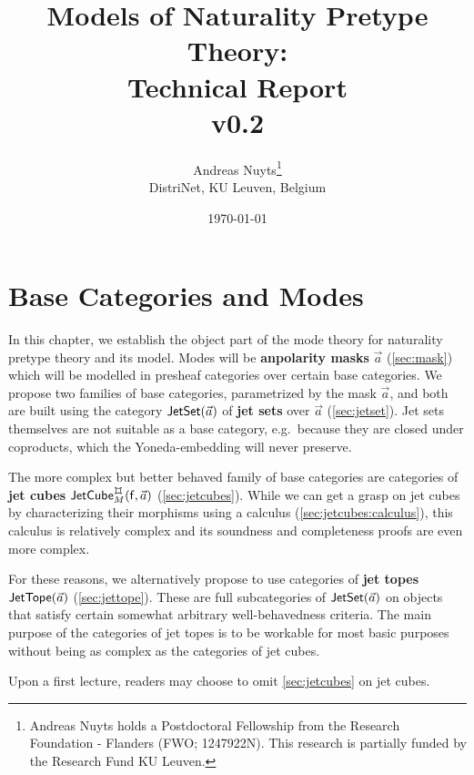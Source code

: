 \documentclass[a4paper]{memoir}
\newcommand{\thetitle}{Models of Naturality Pretype Theory: \\ Technical Report \\ v0.2}
\newcommand{\theauthors}{Andreas Nuyts\thanks{Andreas Nuyts holds a Postdoctoral Fellowship from the Research Foundation - Flanders (FWO; 1247922N). This research is partially funded by the Research Fund KU Leuven.} \\ DistriNet, KU Leuven, Belgium}
\begin{document}
	\addtolength{\voffset}{-.5in}

\title{\thetitle}
\date{\today}
\author{\theauthors{}}
\maketitle

\pagebreak

\tableofcontents


\chapter{Base Categories and Modes} \label{ch:modes}

In this chapter, we establish the object part of the mode theory for naturality pretype theory and its model.
Modes will be \textbf{anpolarity masks} $\vec a$ (\cref{sec:mask}) which will be modelled in presheaf categories over certain base categories.
We propose two families of base categories, parametrized by the mask $\vec a$, and both are built using the category $\mathsf{JetSet}(\vec a)$ of \textbf{jet sets} over $\vec a$ (\cref{sec:jetset}).
Jet sets themselves are not suitable as a base category, e.g.\ because they are closed under coproducts, which the Yoneda-embedding will never preserve.

The more complex but better behaved family of base categories are categories of \textbf{jet cubes} $\jetcubefwd \mycubex M {\vec a}$ (\cref{sec:jetcubes}).
While we can get a grasp on jet cubes by characterizing their morphisms using a calculus (\cref{sec:jetcubes:calculus}), this calculus is relatively complex and its soundness and completeness proofs are even more complex.

For these reasons, we alternatively propose to use categories of \textbf{jet topes} $\mathsf{JetTope}(\vec a)$ (\cref{sec:jettope}). These are full subcategories of $\mathsf{JetSet}(\vec a)$ on objects that satisfy certain somewhat arbitrary well-behavedness criteria.
The main purpose of the categories of jet topes is to be workable for most basic purposes without being as complex as the categories of jet cubes.

Upon a first lecture, readers may choose to omit \cref{sec:jetcubes} on jet cubes.
\end{document}
